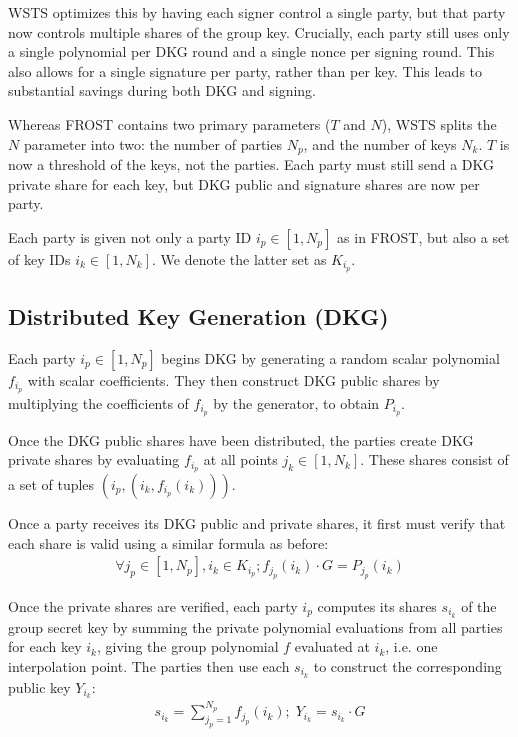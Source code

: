\documentclass{article}
\begin{document}
WSTS optimizes this by having each signer control a single party, but that party now controls multiple shares of the group key.  Crucially, each party still uses only a single polynomial per DKG round and a single nonce per signing round.  This also allows for a single signature per party, rather than per key.  This leads to substantial savings during both DKG and signing.

Whereas FROST contains two primary parameters ($T$ and $N$), WSTS splits the $N$ parameter into two: the number of parties $N_p$, and the number of keys $N_k$.  $T$ is now a threshold of the keys, not the parties.  Each party must still send a DKG private share for each key, but DKG public and signature shares are now per party.

Each party is given not only a party ID $i_p \in [1, N_p]$ as in FROST, but also a set of key IDs $i_k \in [1, N_k]$.  We denote the latter set as $K_{i_p}$.

\subsection{
  Distributed Key Generation (DKG)
}

Each party $i_p \in [1, N_p]$ begins DKG by generating a random scalar polynomial $f_{i_p}$ with scalar coefficients.  They then construct DKG public shares by multiplying the coefficients of $f_{i_p}$ by the generator, to obtain $P_{i_p}$.

Once the DKG public shares have been distributed, the parties create DKG private shares by evaluating $f_{i_p}$ at all points $j_k \in [1, N_k]$.  These shares consist of a set of tuples $(i_p, (i_k, f_{i_p}(i_k)))$.

Once a party receives its DKG public and private shares, it first must verify that each share is valid using a similar formula as before:
\begin{align}
  \forall j_p \in [1,N_p], i_k \in K_{i_p}; f_{j_p}(i_k) \cdot G = P_{j_p}(i_k)
\end{align}

Once the private shares are verified, each party $i_p$ computes its shares $s_{i_k}$ of the group secret key by summing the private polynomial evaluations from all parties for each key $i_k$, giving the group polynomial $f$ evaluated at $i_k$, i.e. one interpolation point. The parties then use each $s_{i_k}$ to construct the corresponding public key $Y_{i_k}$:
\begin{align}
  s_{i_k} = \sum_{j_p = 1}^{N_p} f_{j_p}(i_k) ;\; Y_{i_k} = s_{i_k} \cdot G
\end{align}
\end{document}
